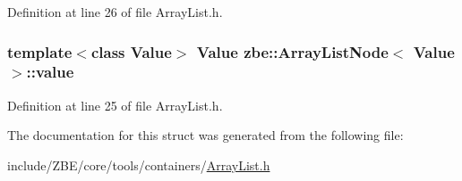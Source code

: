 Definition at line 26 of file Array\+List.\+h.

\hypertarget{structzbe_1_1_array_list_node_a4b6ed91c41d1a05f5cbc5a159f27b97d}{}
\subsubsection[{value}]{\setlength{\rightskip}{0pt plus 5cm}template$<$class Value$>$ Value {\bf zbe\+::\+Array\+List\+Node}$<$ Value $>$\+::value}\label{structzbe_1_1_array_list_node_a4b6ed91c41d1a05f5cbc5a159f27b97d}


Definition at line 25 of file Array\+List.\+h.



The documentation for this struct was generated from the following file\+:\begin{DoxyCompactItemize}
\item 
include/\+Z\+B\+E/core/tools/containers/\hyperlink{_array_list_8h}{Array\+List.\+h}\end{DoxyCompactItemize}
